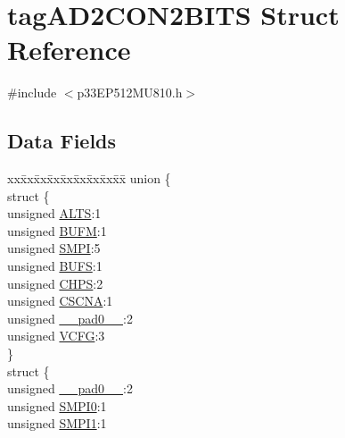 \hypertarget{structtag_a_d2_c_o_n2_b_i_t_s}{}\section{tag\+A\+D2\+C\+O\+N2\+B\+I\+TS Struct Reference}
\label{structtag_a_d2_c_o_n2_b_i_t_s}


{\ttfamily \#include $<$p33\+E\+P512\+M\+U810.\+h$>$}

\subsection*{Data Fields}
\begin{DoxyCompactItemize}
\item 
\begin{tabbing}
xx\=xx\=xx\=xx\=xx\=xx\=xx\=xx\=xx\=\kill
union \{\\
\>struct \{\\
\>\>unsigned \hyperlink{structtag_a_d2_c_o_n2_b_i_t_s_a2ca4bba4fd8aa0ee225e33a1176e77d5}{ALTS}:1\\
\>\>unsigned \hyperlink{structtag_a_d2_c_o_n2_b_i_t_s_ae8ba75a83c3c2b9805c68736be55fa08}{BUFM}:1\\
\>\>unsigned \hyperlink{structtag_a_d2_c_o_n2_b_i_t_s_ad1b5f5e88678d207e1a1643b2a32d45e}{SMPI}:5\\
\>\>unsigned \hyperlink{structtag_a_d2_c_o_n2_b_i_t_s_a30b636279b2b14ed975067c5bb135ec1}{BUFS}:1\\
\>\>unsigned \hyperlink{structtag_a_d2_c_o_n2_b_i_t_s_af592586989b5aefff55bc1b464da0586}{CHPS}:2\\
\>\>unsigned \hyperlink{structtag_a_d2_c_o_n2_b_i_t_s_ab5835d71115f1e3cf69c69d2dcb0dc51}{CSCNA}:1\\
\>\>unsigned \hyperlink{structtag_a_d2_c_o_n2_b_i_t_s_adf71f3d8410c1f1dbbc96680a92c49af}{\_\_pad0\_\_}:2\\
\>\>unsigned \hyperlink{structtag_a_d2_c_o_n2_b_i_t_s_a5abe40529762f93d063581f9c25cae44}{VCFG}:3\\
\>\} \\
\>struct \{\\
\>\>unsigned \hyperlink{structtag_a_d2_c_o_n2_b_i_t_s_adf71f3d8410c1f1dbbc96680a92c49af}{\_\_pad0\_\_}:2\\
\>\>unsigned \hyperlink{structtag_a_d2_c_o_n2_b_i_t_s_a1f4e3902bbb6a31f3e0c074b6db0b021}{SMPI0}:1\\
\>\>unsigned \hyperlink{structtag_a_d2_c_o_n2_b_i_t_s_ad9c086bd1573d17af86b7dd8a21510f6}{SMPI1}:1\\

\end{tabbing}
\end{DoxyCompactItemize}
